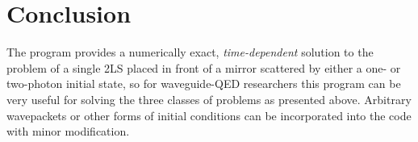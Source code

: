 \documentclass[final,1p,times]{elsarticle}
\newcounter{bla}
\begin{document}
%
%

\section{Conclusion}
The program provides a numerically exact, \emph{time-dependent} solution to the problem of a single 2LS placed in front of a mirror scattered by either a one- or two-photon initial state, so for waveguide-QED researchers this program can be very useful for solving the three classes of problems as presented above. Arbitrary wavepackets or other forms of initial conditions can be incorporated into the code with minor modification. 
\end{document}
